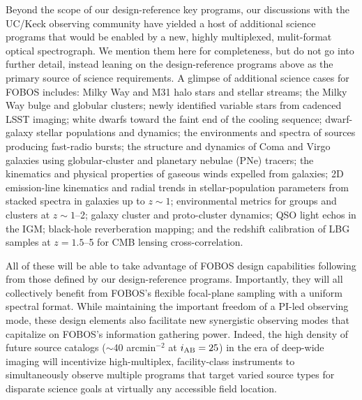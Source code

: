 \documentclass[11pt,a4paper,twoside,onecolumn,openany,final,oldfontcommands]{memoir}
\begin{document}
Beyond the scope of our design-reference key programs, our discussions with the UC/Keck observing community have yielded a host of additional science programs that would be enabled by a new, highly multiplexed, mulit-format optical spectrograph.  We mention them here for completeness, but do not go into further detail, instead leaning on the design-reference programs above as the primary source of science requirements.  A glimpse of additional science cases for FOBOS includes: Milky Way and M31 halo stars and stellar streams; the Milky Way bulge and globular clusters; newly identified variable stars from cadenced LSST imaging; white dwarfs toward the faint end of the cooling sequence; dwarf-galaxy stellar populations and dynamics; the environments and spectra of sources producing fast-radio bursts;  the structure and dynamics of Coma and Virgo galaxies using globular-cluster and planetary nebulae (PNe) tracers; the kinematics and physical properties of gaseous winds expelled from galaxies; 2D emission-line kinematics and radial trends in stellar-population parameters from stacked spectra in galaxies up to $z \sim 1$; environmental metrics for groups and clusters at $z \sim 1$--2; galaxy cluster and proto-cluster dynamics; QSO light echos in the IGM; black-hole reverberation mapping; and the redshift calibration of LBG samples at $z = 1.5$--5 for CMB lensing cross-correlation.

All of these will be able to take advantage of FOBOS design capabilities following from those defined by our design-reference programs.  Importantly, they will all collectively benefit from FOBOS's flexible focal-plane sampling with a uniform spectral format.  While maintaining the important freedom of a PI-led observing mode, these design elements also facilitate new synergistic observing modes that capitalize on FOBOS's information gathering power. Indeed, the high density of future source catalogs ($\sim$40 arcmin$^{-2}$ at $i_{\rm AB} = 25$) in the era of deep-wide imaging will incentivize high-multiplex, facility-class instruments to simultaneously observe multiple programs that target varied source types for disparate science goals at virtually any accessible field location.
\end{document}
